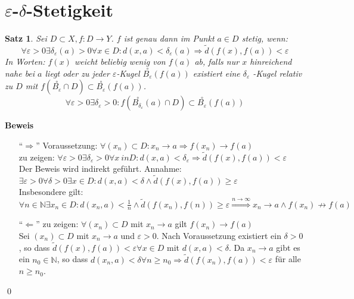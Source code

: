 \documentclass[ngerman,titlepage,twoside, parskip=half*]{scrreprt}
\newcommand*{\N}{\mathbb{N}}
\theoremstyle{plain}
\newtheorem{theorem}{Satz}[section]
\theoremstyle{definition}
\theoremstyle{remark}
\begin{document}
\section{\texorpdfstring{$\varepsilon$-$\delta$}{epsisol-delta}-Stetigkeit}
\begin{theorem}
\label{satz:e-d-stetig}
Sei $D\subset X, f\colon D\rightarrow Y$. $f$ ist genau dann im Punkt $a\in D$ stetig, wenn:
\[\forall \varepsilon >0 \exists \delta_{\varepsilon}(a)>0 \forall x \in D\colon d(x,a)<\delta_{\varepsilon}
(a)\Rightarrow  \tilde{d}(f(x),f(a))<\varepsilon\]
In Worten: $f(x)$ weicht beliebig wenig von $f(a)$ ab, falls nur $x$ hinreichend nahe bei $a$ liegt oder 
zu jeder $\varepsilon$-Kugel $\stackrel{\circ}{B_{\varepsilon}}(f(a))$ existiert eine $\delta_{\varepsilon}$
-Kugel relativ zu $D$ mit $f(\stackrel{\circ}{B_{\varepsilon}}\cap D)\subset \stackrel{\circ}{B_{\varepsilon}}
(f(a))$.
\[\forall \varepsilon >0 \exists \delta_{\varepsilon}>0\colon f(\stackrel{\circ}{B_{\delta_{\varepsilon}}}(a)
\cap D) \subset \stackrel{\circ}{B_{\varepsilon}}(f(a))\]
\end{theorem}
\textbf{Beweis}
\begin{itemize}
  \item["`$\Rightarrow$"'] Voraussetzung: $\forall (x_n)\subset D\colon x_n\rightarrow a \Rightarrow f(x_n)
    \rightarrow f(a)$\\
    zu zeigen: $\forall \varepsilon >0 \exists \delta_{\varepsilon} >0 \forall x\ in D\colon d(x,a)<
    \delta_{\varepsilon}\Rightarrow \tilde{d}(f(x),f(a))<\varepsilon$\\
    Der Beweis wird indirekt geführt. Annahme: $\exists \varepsilon >0 \forall \delta >0 \exists
    x \in D\colon d(x,a)<\delta \wedge \tilde{d} (f(x),f(a))\geq \varepsilon$\\
    Insbesondere gilt: $\forall n \in \N \exists x_n \in D\colon d(x_n,a)<\frac{1}{n} \wedge \tilde{d}(f(x_n),
    f(n))\geq \varepsilon \stackrel{n\rightarrow \infty}{\Longrightarrow} x_n \rightarrow a \wedge 
    f(x_n)\not\rightarrow f(a)$
   \lightning
  \item["`$\Leftarrow$"'] zu zeigen: $\forall (x_n) \subset D$ mit $x_n\rightarrow a$ gilt $f(x_n)
    \rightarrow f(a)$\\
    Sei $(x_n)\subset D$ mit $x_n\rightarrow a$ und $\varepsilon >0$. Nach Voraussetzung existiert ein
    $\delta >0$, so dass $\tilde{d}(f(x),f(a))<\varepsilon \forall x \in D$ mit $d(x,a)<\delta$. Da
    $x_n\rightarrow a$ gibt es ein $n_0\in \N$, so dass $d(x_n,a)<\delta \forall n\geq n_0
    \Rightarrow \tilde{d}(f(x_n),f(a))<\varepsilon$ für alle $n\geq n_0$.
\end{itemize}
\qed
\end{document}
